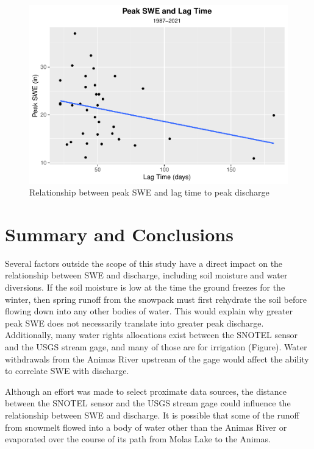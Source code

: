 \documentclass[
  12pt,
]{article}
\begin{document}
\begin{figure}
\centering
\includegraphics{Final_Report_files/figure-latex/unnamed-chunk-8-1.pdf}
\caption{Relationship between peak SWE and lag time to peak discharge}
\end{figure}

\newpage

\hypertarget{summary-and-conclusions}{%
\section{Summary and Conclusions}\label{summary-and-conclusions}}

Several factors outside the scope of this study have a direct impact on
the relationship between SWE and discharge, including soil moisture and
water diversions. If the soil moisture is low at the time the ground
freezes for the winter, then spring runoff from the snowpack must first
rehydrate the soil before flowing down into any other bodies of water.
This would explain why greater peak SWE does not necessarily translate
into greater peak discharge. Additionally, many water rights allocations
exist between the SNOTEL sensor and the USGS stream gage, and many of
those are for irrigation (Figure). Water withdrawals from the Animas
River upstream of the gage would affect the ability to correlate SWE
with discharge.

Although an effort was made to select proximate data sources, the
distance between the SNOTEL sensor and the USGS stream gage could
influence the relationship between SWE and discharge. It is possible
that some of the runoff from snowmelt flowed into a body of water other
than the Animas River or evaporated over the course of its path from
Molas Lake to the Animas.
\end{document}
